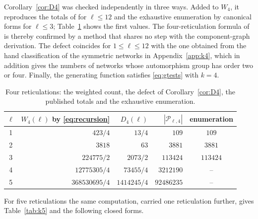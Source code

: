 \documentclass[11pt,a4paper]{article}
\theoremstyle{definition}
\newcommand{\cP}{\mathcal{P}}
\begin{document}
Corollary~\ref{cor:D4} was checked independently in three ways. Added to $W_4$, it reproduces the totals of \cite{YuZhang26} for $\ell\le12$ and the exhaustive enumeration by canonical forms for $\ell\le3$; Table~\ref{tab:k4} shows the first values. The four-reticulation formula of \cite{YuZhang26} is thereby confirmed by a method that shares no step with the component-graph derivation. The defect coincides for $1\le\ell\le12$ with the one obtained from the hand classification of the symmetric networks in Appendix~\ref{app:k4}, which in addition gives the numbers of networks whose automorphism group has order two or four. Finally, the generating function satisfies \eqref{eq:gtests} with $k=4$.

\begin{table}[t]
\centering
\begin{tabular}{crrrc}
\toprule
$\ell$ & $W_4(\ell)$ by \eqref{eq:recursion} & $D_4(\ell)$ & $|\cP_{\ell,4}|$ \cite{YuZhang26} & enumeration\\
\midrule
1 & $423/4$ & $13/4$ & $109$ & $109$\\
2 & $3818$ & $63$ & $3881$ & $3881$\\
3 & $224775/2$ & $2073/2$ & $113424$ & $113424$\\
4 & $12775305/4$ & $73455/4$ & $3212190$ & --\\
5 & $368530695/4$ & $1414245/4$ & $92486235$ & --\\
\bottomrule
\end{tabular}
\caption{Four reticulations: the weighted count, the defect of Corollary~\ref{cor:D4}, the published totals and the exhaustive enumeration.}
\label{tab:k4}
\end{table}

For five reticulations the same computation, carried one reticulation further, gives Table~\ref{tab:k5} and the following closed forms.
\end{document}

